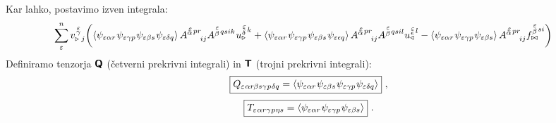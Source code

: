 Kar lahko, postavimo izven integrala:
\begin{equation*}
   \mkern-20mu \sum^n_\varepsilon
   v^{\mkern 2mu \substack{\varepsilon \\[-0.65mm] \gamma \\[-0.2mm]}}_{\triangleright \mkern5mu j}
   \qty( \expval{
      \psi_{ \varepsilon \alpha r} \mkern1mu
      \psi_{\varepsilon \gamma p} \mkern1mu
      \psi_{\varepsilon \beta s} \mkern1mu
      \psi_{\varepsilon \delta q} }
   A^{\substack{\mkern2mu \varepsilon \\[-0.65mm] \alpha} \mkern2mu p r}_{\mkern29mu i j}
   A^{\substack{\mkern2mu \varepsilon \\[0.05mm] \beta} \mkern2mu q s i k} \mkern1mu
   u^{\substack{\mkern2mu \varepsilon \\[0.09mm] \delta} \mkern2mu k}_\triangleright
   +
   \expval{
      \psi_{ \varepsilon \alpha r} \mkern1mu
      \psi_{\varepsilon \gamma p} \mkern1mu
      \psi_{\varepsilon \beta s} \mkern1mu
      \psi_{\varepsilon \epsilon q} }
   A^{\substack{\mkern2mu \varepsilon \\[-0.65mm] \alpha} \mkern2mu p r}_{\mkern29mu i j}
   A^{\substack{\mkern2mu \varepsilon \\[0.05mm] \beta} \mkern2mu q s i l}
   u^{\substack{\mkern2mu \varepsilon \\[-0.55mm] \epsilon} \mkern2mu l}_\triangleleft
   -
   \expval{
      \psi_{ \varepsilon \alpha r} \mkern1mu
      \psi_{\varepsilon \gamma p} \mkern1mu
      \psi_{\varepsilon \beta s} }
   A^{\substack{\mkern2mu \varepsilon \\[-0.65mm] \alpha} \mkern2mu p r}_{\mkern29mu i j}
   f^{\substack{\mkern2mu \varepsilon \\[0.05mm] \beta} \mkern2mu s i}_{\bowtie} )
\end{equation*}
Definiramo tenzorja $\bm{\mathsf{Q}}$ (četverni prekrivni integrali) in $\bm{\mathsf{T}}$ (trojni prekrivni integrali):
\begin{equation}
   \boxed{
   Q_{\varepsilon \mkern1mu  \alpha r  \mkern-1mu \beta s   \gamma \mkern1mu p \mkern1mu  \delta q}
   =
   \expval{
      \psi_{ \varepsilon   \alpha r} \mkern1mu
      \psi_{ \varepsilon   \beta s} \mkern1mu
      \psi_{ \varepsilon   \gamma p} \mkern1mu
      \psi_{ \varepsilon   \delta q} } } \ ,
\end{equation}
\begin{equation}
   \boxed{
   T_{\varepsilon \mkern1mu  \alpha r   \gamma \mkern1mu p  \mkern1mu \eta s}
   =
   \expval{
      \psi_{\varepsilon \alpha r} \mkern1mu
      \psi_{\varepsilon \gamma p} \mkern1mu
      \psi_{ \varepsilon \beta s} } } \ .
\end{equation}
